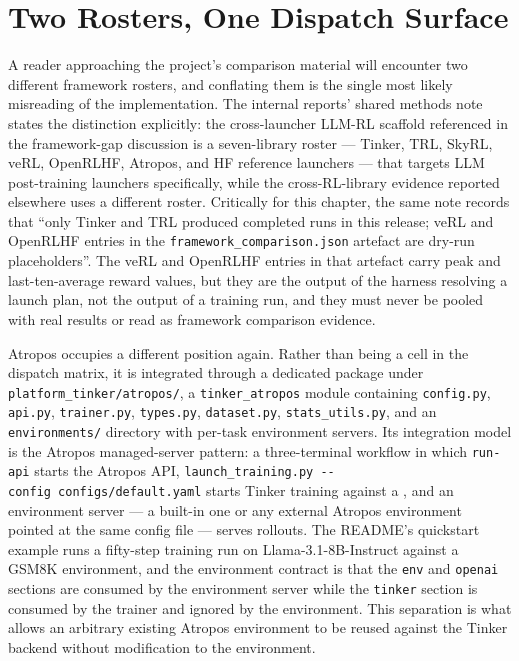 \documentclass[12pt,a4paper]{report}
\DeclareRobustCommand{\longtok}[1]{\texttt{\seqsplit{#1}}}
\begin{document}
\section{Two Rosters, One Dispatch
Surface}\label{two-rosters-one-dispatch-surface}

A reader approaching the project's comparison material will encounter
two different framework rosters, and conflating them is the single most
likely misreading of the implementation. The internal reports' shared
methods note states the distinction explicitly: the cross-launcher
LLM-RL scaffold referenced in the framework-gap discussion is a
seven-library roster --- Tinker, TRL, SkyRL, veRL, OpenRLHF, Atropos,
and HF reference launchers --- that targets LLM post-training launchers
specifically, while the cross-RL-library evidence reported elsewhere
uses a different roster. Critically for this chapter, the same note
records that ``only Tinker and TRL produced completed runs in this
release; veRL and OpenRLHF entries in the
\texttt{framework\_comparison.json} artefact are dry-run placeholders''.
The veRL and OpenRLHF entries in that artefact carry peak and
last-ten-average reward values, but they are the output of the harness
resolving a launch plan, not the output of a training run, and they must
never be pooled with real results or read as framework comparison
evidence.

Atropos occupies a different position again. Rather than being a cell in
the dispatch matrix, it is integrated through a dedicated package under
\texttt{platform\_tinker/atropos/}, a \texttt{tinker\_atropos} module
containing \texttt{config.py}, \texttt{api.py}, \texttt{trainer.py},
\texttt{types.py}, \texttt{dataset.py}, \texttt{stats\_utils.py}, and an
\texttt{environments/} directory with per-task environment servers. Its
integration model is the Atropos managed-server pattern: a
three-terminal workflow in which \texttt{run-api} starts the Atropos
API, \texttt{launch\_training.py\ -\/-config\ configs/default.yaml}
starts Tinker training against a \longtok{TINKER\_\allowbreak{}API\_\allowbreak{}KEY}, and an
environment server --- a built-in one or any external Atropos
environment pointed at the same config file --- serves rollouts. The
README's quickstart example runs a fifty-step training run on
Llama-3.1-8B-Instruct against a GSM8K environment, and the environment
contract is that the \texttt{env} and \texttt{openai} sections are
consumed by the environment server while the \texttt{tinker} section is
consumed by the trainer and ignored by the environment. This separation
is what allows an arbitrary existing Atropos environment to be reused
against the Tinker backend without modification to the environment.
\end{document}
